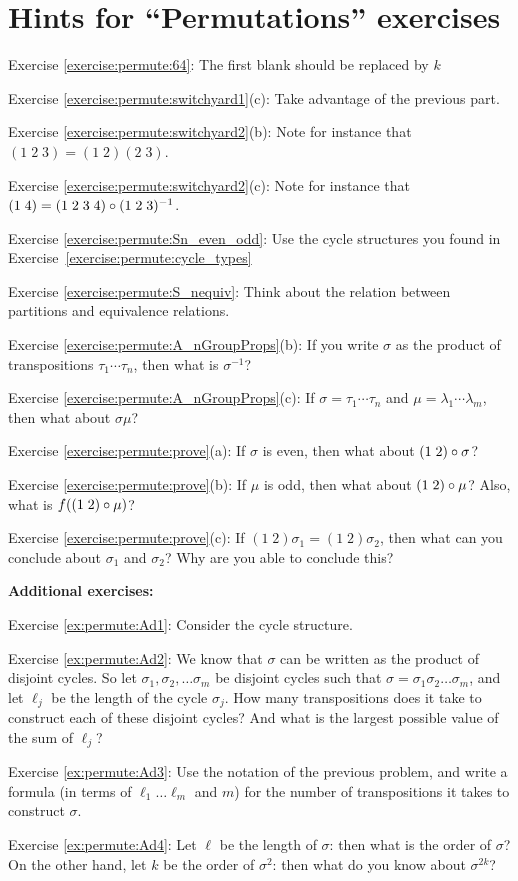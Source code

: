 \section{Hints for ``Permutations'' exercises}\label{sec:permute:hints} 

\noindent Exercise \ref{exercise:permute:64}: The first blank should be replaced by $k$

\noindent Exercise \ref{exercise:permute:switchyard1}(c): Take advantage of the previous part.

\noindent Exercise \ref{exercise:permute:switchyard2}(b): Note for instance that $(1 \;2 \; 3) = (1 \; 2) (2 \; 3)$.

\noindent Exercise \ref{exercise:permute:switchyard2}(c): Note for instance that $(1 \;4 ) = (1 \; 2 \; 3 \; 4) \circ (1 \; 2 \; 3 )^{-1}$.

\noindent Exercise \ref{exercise:permute:Sn_even_odd}: Use the cycle structures you found in Exercise~\ref{exercise:permute:cycle_types}

\noindent Exercise \ref{exercise:permute:S_nequiv}: Think about the relation between partitions and equivalence relations.

\noindent Exercise \ref{exercise:permute:A_nGroupProps}(b): If you write $\sigma$ as the product of transpositions $\tau_1 \cdots \tau_{n}$, then what is $\sigma^{-1}$?

\noindent Exercise \ref{exercise:permute:A_nGroupProps}(c): If $\sigma = \tau_1 \cdots \tau_{n}$ and $\mu = \lambda_1 \cdots \lambda_{m}$, then what about $\sigma \mu$?

\noindent Exercise \ref{exercise:permute:prove}(a): If $\sigma$ is even, then what about $(1 \; 2) \circ \sigma$?

\noindent Exercise \ref{exercise:permute:prove}(b): If $\mu$ is odd, then what about $(1 \; 2) \circ \mu$? Also, what is $f( (1 \; 2) \circ \mu )$?

\noindent Exercise \ref{exercise:permute:prove}(c): If $(1 \; 2) \sigma_1 = (1 \; 2) \sigma_2$, then what can you conclude about $\sigma_1$ and $\sigma_2$? Why are you able to conclude this?
\bigskip

\textbf{Additional exercises:}

\noindent Exercise \ref{ex:permute:Ad1}: Consider the cycle structure.

\noindent Exercise \ref{ex:permute:Ad2}: We know that $\sigma$ can be written as the product of disjoint cycles. So let $\sigma_1, \sigma_2, \ldots \sigma_m$ be disjoint cycles such that  $\sigma = \sigma_1 \sigma_2 \ldots \sigma_m$, and let $\ell_j$ be the length of the cycle $\sigma_j$. How many transpositions does it take to construct each of these disjoint cycles? And what is the largest possible value of the sum of $\ell_j$?

\noindent Exercise \ref{ex:permute:Ad3}: Use the notation of the previous problem, and write a formula (in terms of $\ell_1 \ldots \ell_m$ and $m$) for the number of transpositions it takes to construct $\sigma$.

\noindent Exercise \ref{ex:permute:Ad4}: Let $\ell$ be the length of $\sigma$: then what is the order of $\sigma$? On the other hand, let $k$ be the order of $\sigma^2$: then what do you know about $\sigma^{2k}$?
